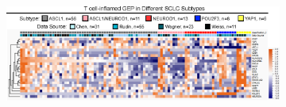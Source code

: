 \begin{figure}[htb]
    \centering
    \begin{subfigure}{0.84\textwidth}
        \includegraphics[width=\linewidth,keepaspectratio]{images/sclc/tis_genes_heatmap_sclc_subtype}
        \caption{}\label{fig:sclc:tis_genes_heatmap_sclc_subtype}
    \end{subfigure}
    

\end{figure}
